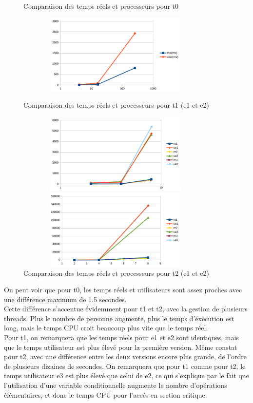 \documentclass[11pt]{article} %
\begin{document}
\begin{figure}[!h]
  \centering
\caption{Comparaison des temps réels et processeurs pour t0}

\includegraphics[width=10cm, height=4cm]{t0}

 \caption{Comparaison des temps réels et processeurs pour t1 (e1 et e2)}

\includegraphics[width=10cm,height=4cm]{t1e3}

 \caption{Comparaison des temps réels et processeurs pour t2 (e1 et e2)}

\includegraphics[width=10cm,height=4cm]{t2e3}
\end{figure}


\newpage

On peut voir que pour t0, les temps réels et utilisateurs sont assez proches avec une différence maximum de 1.5 secondes. \\
Cette différence s'accentue évidemment pour t1 et t2, avec la gestion de plusieurs threads. Plus le nombre de personne augmente, plus le temps d'éxécution est long, mais le temps CPU croit beaucoup plus vite que le temps réel. \\
Pour t1, on remarquera que les temps réels pour e1 et e2 sont identiques, mais que le temps utilisateur est plus élevé pour la première version. Même constat pour t2, avec une différence entre les deux versions encore plus grande, de l'ordre de plusieurs dizaines de secondes. On remarquera que pour t1 comme pour t2, le temps utilisateur e3 est plus élevé que celui de e2, ce qui s'explique par le fait que l'utilisation d'une variable conditionnelle augmente le nombre d'opérations élémentaires, et donc le temps CPU pour l'accés en section critique.
\end{document}
